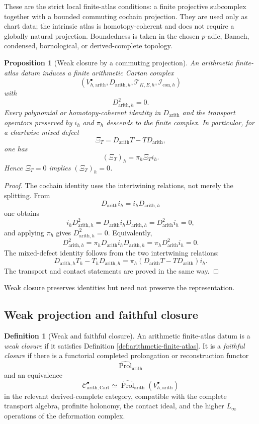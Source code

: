 \documentclass[11pt]{article}
\newtheorem{proposition}[theorem]{Proposition}
\theoremstyle{definition}
\newtheorem{definition}[theorem]{Definition}
\newcommand{\cC}{\mathcal C}
\newcommand{\cI}{\mathcal I}
\newcommand{\arith}{\mathrm{arith}}
\begin{document}
These are the strict local finite-atlas conditions: a finite projective subcomplex together with a bounded commuting cochain projection.  They are used only as chart data; the intrinsic atlas is homotopy-coherent and does not require a globally natural projection.  Boundedness is taken in the chosen $p$-adic, Banach, condensed, bornological, or derived-complete topology.

\begin{proposition}[Weak closure by a commuting projection]\label{prop:weak-closure}
An arithmetic finite-atlas datum induces a finite arithmetic Cartan complex
\[
(V^\bullet_{h,\arith},D_{\arith,h},\mathcal T_{K,E,h},\cI_{\mathrm{con},h})
\]
with
\[
D_{\arith,h}^2=0.
\]
Every polynomial or homotopy-coherent identity in $D_{\arith}$ and the transport operators preserved by $i_h$ and $\pi_h$ descends to the finite complex.  In particular, for a chartwise mixed defect
\[
\Xi_T=D_{\arith}T-TD_{\arith},
\]
one has
\[
(\Xi_T)_h=\pi_h\Xi_T i_h.
\]
Hence $\Xi_T=0$ implies $(\Xi_T)_h=0$.
\end{proposition}

\begin{proof}
The cochain identity uses the intertwining relations, not merely the splitting.  From
\[
D_{\arith}i_h=i_hD_{\arith,h}
\]
one obtains
\[
i_hD_{\arith,h}^2
=D_{\arith}i_hD_{\arith,h}
=D_{\arith}^2i_h=0,
\]
and applying $\pi_h$ gives $D_{\arith,h}^2=0$.  Equivalently,
\[
D_{\arith,h}^2
=\pi_hD_{\arith}i_hD_{\arith,h}
=\pi_hD_{\arith}^2i_h=0.
\]
The mixed-defect identity follows from the two intertwining relations:
\[
D_{\arith,h}T_h-T_hD_{\arith,h}
=\pi_h(D_{\arith}T-TD_{\arith})i_h.
\]
The transport and contact statements are proved in the same way.
\end{proof}

Weak closure preserves identities but need not preserve the representation.

\subsection{Weak projection and faithful closure}

\begin{definition}[Weak and faithful closure]\label{def:faithful-closure}
An arithmetic finite-atlas datum is a \emph{weak closure} if it satisfies Definition \ref{def:arithmetic-finite-atlas}.  It is a \emph{faithful closure} if there is a functorial completed prolongation or reconstruction functor
\[
\widehat{\operatorname{Prol}}_{\arith}
\]
and an equivalence
\begin{equation}\label{eq:faithful-reconstruction}
\cC^\bullet_{\arith,\mathrm{Cart}}
\simeq
\widehat{\operatorname{Prol}}_{\arith}
(V^\bullet_{h,\arith})
\end{equation}
in the relevant derived-complete category, compatible with the complete transport algebra, profinite holonomy, the contact ideal, and the higher $L_\infty$ operations of the deformation complex.
\end{definition}
\end{document}
